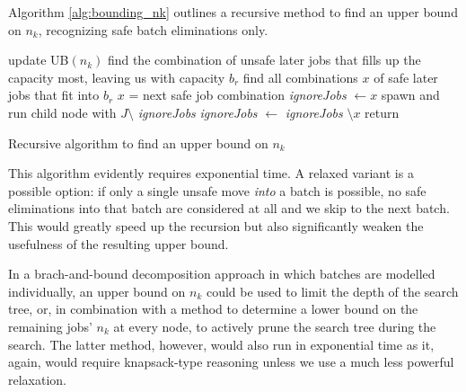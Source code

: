 Algorithm \ref{alg:bounding_nk} outlines a recursive method to find an upper
bound on $n_k$, recognizing safe batch eliminations only.

\begin{algorithm}[h]
\fontsize{9pt}{11.5pt}\selectfont
\begin{algorithmic}
 
  \State update UB$(n_k)$
\EndIf
\State find the combination of unsafe later jobs that fills up the capacity
most, leaving us with capacity $b_r$ 
\State find all combinations $x$ of safe later jobs that fit into $b_r$
\Repeat
  \State $x$ = next safe job combination
  \State \textit{ignoreJobs} $\gets x$ 
  \State spawn and run child node with $J \setminus$ \textit{ignoreJobs}
  \State \textit{ignoreJobs} $\gets$ \textit{ignoreJobs} $\setminus x$
\State return
\end{algorithmic}
\caption{Recursive algorithm to find an upper bound on $n_k$}
\label{alg:bounding_nk}
\end{algorithm}

This algorithm evidently requires exponential time. A relaxed variant is a
possible option: if only a single unsafe move \textit{into} a batch is possible,
no safe eliminations into that batch are considered at all and we skip to the
next batch. This would greatly speed up the recursion but also significantly
weaken the usefulness of the resulting upper bound.

In a brach-and-bound decomposition approach in which batches are modelled
individually, an upper bound on $n_k$ could be used to limit the depth of the
search tree, or, in combination with a method to determine a lower bound on the
remaining jobs' $n_k$ at every node, to actively prune the search tree during
the search. The latter method, however, would also run in exponential time as
it, again, would require knapsack-type reasoning unless we use a much less powerful
relaxation.


